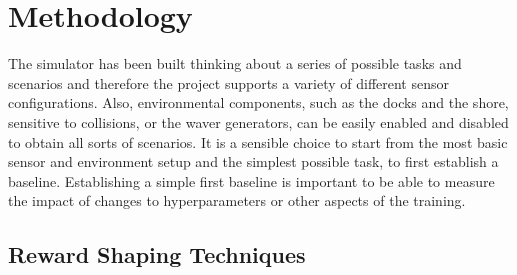 \section{Methodology}


\begin{textblock}
The simulator has been built thinking about a series of possible tasks and scenarios and therefore the project supports a variety of different sensor configurations. Also, environmental components, such as the docks and the shore, sensitive to collisions, or the waver generators, can be easily enabled and disabled to obtain all sorts of scenarios. 
It is a sensible choice to start from the most basic sensor and environment setup and the simplest possible task, to first establish a baseline.
Establishing a simple first baseline is important to be able to measure the impact of changes to hyperparameters or other aspects of the training.
\end{textblock}

\subsection{Reward Shaping Techniques}


